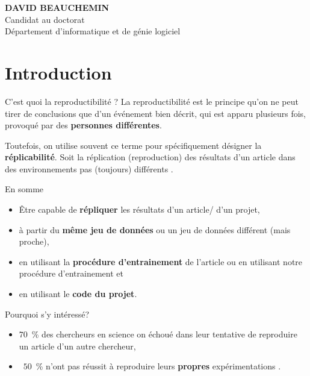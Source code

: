 \documentclass[aspectratio=169,10pt,xcolor=x11names,english,french]{beamer}
\begin{document}
\begin{frame}
		\begin{minipage}{0.25\linewidth}
			\small
			\textbf{DAVID BEAUCHEMIN} \\
			Candidat au doctorat \\
			Département d'informatique et de génie logiciel
		\end{minipage}
	\end{frame}
	
	\section{Introduction}
	\begin{frame}{C'est quoi la reproductibilité ?}
		La reproductibilité est le principe qu'on ne peut tirer de conclusions que d'un événement bien décrit, qui est apparu plusieurs fois, provoqué par des \textbf{personnes différentes}.
		
		Toutefois, on utilise souvent ce terme pour spécifiquement désigner la \textbf{réplicabilité}. Soit la réplication (reproduction) des résultats d'un article dans des environnements pas (toujours) différents \cite{replicationvsreproductiblity, pineau2020improving}.
	\end{frame}
	
	\begin{frame}{En somme}
		\begin{itemize}
			\item<1-> Être capable de \textbf{répliquer} les résultats d'un article/ d'un projet,
			\item<2-> à partir du \textbf{même jeu de données} ou un jeu de données différent (mais proche),
			\item<3-> en utilisant la \textbf{procédure d'entrainement} de l'article ou en utilisant notre procédure d'entrainement et
			\item<4-> en utilisant le \textbf{code du projet}.
		\end{itemize}
	\end{frame}
	
	\begin{frame}{Pourquoi s'y intéressé?}
		\begin{itemize}
			\item<1-> $70$~\% des chercheurs en science on échoué dans leur tentative de reproduire un article d'un autre chercheur,
			\item<2-> ~$50$~\% n'ont pas réussit à reproduire leurs \textbf{propres} expérimentations \cite{baker500ScientistsLift2016}.
		\end{itemize}
	\end{frame}
	
\end{document}
